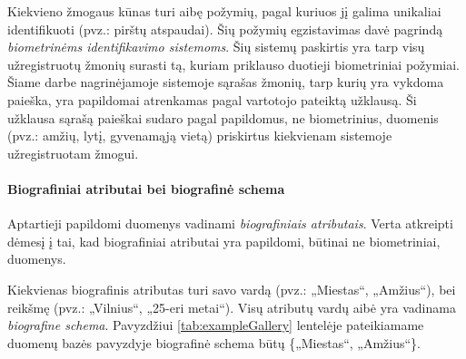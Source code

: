 

Kiekvieno žmogaus kūnas turi aibę požymių, pagal kuriuos jį galima unikaliai identifikuoti (pvz.: pirštų atspaudai).
Šių požymių egzistavimas davė pagrindą {\it biometrinėms identifikavimo sistemoms}.
Šių sistemų paskirtis yra tarp visų užregistruotų žmonių surasti tą, kuriam priklauso duotieji biometriniai požymiai.
Šiame darbe nagrinėjamoje sistemoje \cite{NeurotechnologyMegamatcherAccelerator} sąrašas žmonių, tarp kurių yra vykdoma paieška, yra papildomai atrenkamas pagal vartotojo pateiktą užklausą.
Ši užklausa sąrašą paieškai sudaro pagal papildomus, ne biometrinius, duomenis (pvz.: amžių, lytį, gyvenamąją vietą) priskirtus kiekvienam sistemoje užregistruotam žmogui.


\paragraph{Biografiniai atributai bei biografinė schema}

Aptartieji papildomi duomenys vadinami {\it biografiniais atributais}.
Verta atkreipti dėmesį į tai, kad biografiniai atributai yra papildomi, būtinai ne biometriniai, duomenys.

Kiekvienas biografinis atributas turi savo vardą (pvz.: „Miestas“, „Amžius“), bei reikšmę (pvz.: „Vilnius“, „25-eri metai“).
Visų atributų vardų aibė yra vadinama {\it biografine schema}.
Pavyzdžiui \ref{tab:exampleGallery} lentelėje pateikiamame duomenų bazės pavyzdyje biografinė schema būtų \{„Miestas“, „Amžius“\}.

